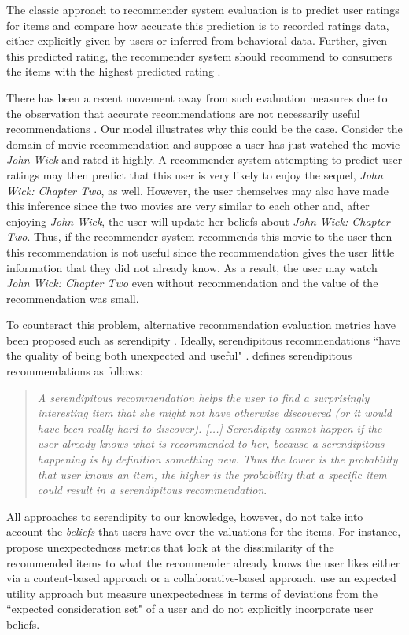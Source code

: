 \documentclass[sigconf]{acmart}
\begin{document}
The classic approach to recommender system evaluation is to predict user ratings for items and compare how accurate this prediction is to recorded ratings data, either explicitly given by users or inferred from behavioral data. Further, given this predicted rating, the recommender system should recommend to consumers the items with the highest predicted rating \cite{adomavicius2005toward}.

There has been a recent movement away from such evaluation measures due to the observation that accurate recommendations are not necessarily useful recommendations \cite{mcnee2006being}. Our model illustrates why this could be the case. Consider the domain of movie recommendation and suppose a user has just watched the movie \textit{John Wick} and rated it highly. A recommender system attempting to predict user ratings may then predict that this user is very likely to enjoy the sequel, \textit{John Wick: Chapter Two}, as well. However, the user themselves may also have made this inference since the two movies are very similar to each other and, after enjoying \textit{John Wick}, the user will update her beliefs about \textit{John Wick: Chapter Two}. Thus, if the recommender system recommends this movie to the user then this recommendation is not useful since the recommendation gives the user little information that they did not already know. As a result, the user may watch \textit{John Wick: Chapter Two} even without recommendation and the value of the recommendation was small.

To counteract this problem, alternative recommendation evaluation metrics have been proposed such as serendipity
\cite{kotkov2016survey, kotkov2016challenges}. Ideally, serendipitous recommendations ``have the quality of being both unexpected and useful" \cite{maksai2015predicting}. \cite{iaquinta2010can} defines serendipitous recommendations as follows:
\begin{quote}
\textit{A serendipitous recommendation helps the
user to find a surprisingly interesting item that
she might not have otherwise discovered (or it
would have been really hard to discover). [...]
Serendipity cannot happen if the user already
knows what is recommended to her, because a
serendipitous happening is by definition something new. Thus the lower is the probability that user knows an item, the higher is the
probability that a specific item could result
in a serendipitous recommendation}.
\end{quote}

All approaches to serendipity to our knowledge, however, do not take into account the \textit{beliefs} that users have over the valuations for the items. For instance, \cite{vargas2011rank, kaminskas2014measuring} propose unexpectedness metrics that look at the dissimilarity of the recommended items to what the recommender already knows the user likes either via a content-based approach or a collaborative-based approach. \cite{adamopoulos2015unexpectedness} use an expected utility approach but measure unexpectedness in terms of deviations from the ``expected consideration set" of a user and do not explicitly incorporate user beliefs.
\end{document}

